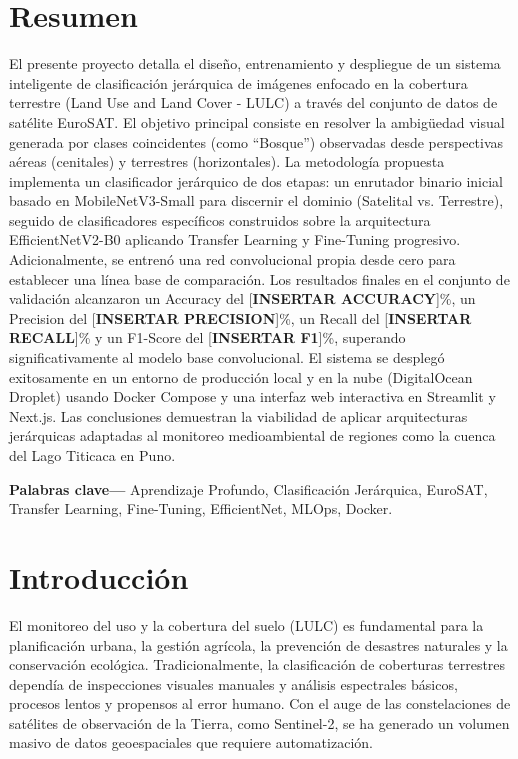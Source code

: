 \documentclass[conference,onecolumn]{IEEEtran}
\begin{document}
\section{Resumen}
El presente proyecto detalla el diseño, entrenamiento y despliegue de un sistema inteligente de clasificación jerárquica de imágenes enfocado en la cobertura terrestre (Land Use and Land Cover - LULC) a través del conjunto de datos de satélite EuroSAT. El objetivo principal consiste en resolver la ambigüedad visual generada por clases coincidentes (como ``Bosque'') observadas desde perspectivas aéreas (cenitales) y terrestres (horizontales). La metodología propuesta implementa un clasificador jerárquico de dos etapas: un enrutador binario inicial basado en MobileNetV3-Small para discernir el dominio (Satelital vs. Terrestre), seguido de clasificadores específicos construidos sobre la arquitectura EfficientNetV2-B0 aplicando Transfer Learning y Fine-Tuning progresivo. Adicionalmente, se entrenó una red convolucional propia desde cero para establecer una línea base de comparación. Los resultados finales en el conjunto de validación alcanzaron un Accuracy del [\textbf{INSERTAR ACCURACY}]\%, un Precision del [\textbf{INSERTAR PRECISION}]\%, un Recall del [\textbf{INSERTAR RECALL}]\% y un F1-Score del [\textbf{INSERTAR F1}]\%, superando significativamente al modelo base convolucional. El sistema se desplegó exitosamente en un entorno de producción local y en la nube (DigitalOcean Droplet) usando Docker Compose y una interfaz web interactiva en Streamlit y Next.js. Las conclusiones demuestran la viabilidad de aplicar arquitecturas jerárquicas adaptadas al monitoreo medioambiental de regiones como la cuenca del Lago Titicaca en Puno.

\textbf{Palabras clave---} Aprendizaje Profundo, Clasificación Jerárquica, EuroSAT, Transfer Learning, Fine-Tuning, EfficientNet, MLOps, Docker.

\section{Introducción}
El monitoreo del uso y la cobertura del suelo (LULC) es fundamental para la planificación urbana, la gestión agrícola, la prevención de desastres naturales y la conservación ecológica. Tradicionalmente, la clasificación de coberturas terrestres dependía de inspecciones visuales manuales y análisis espectrales básicos, procesos lentos y propensos al error humano. Con el auge de las constelaciones de satélites de observación de la Tierra, como Sentinel-2, se ha generado un volumen masivo de datos geoespaciales que requiere automatización.
\end{document}
